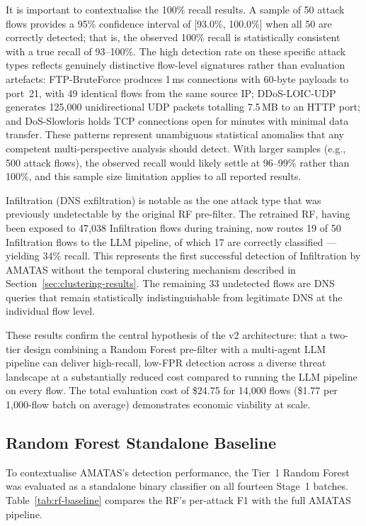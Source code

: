 \documentclass[../main.tex]{subfiles}
\begin{document}
It is important to contextualise the 100\% recall results. A sample of 50 attack flows provides a 95\% confidence interval of [93.0\%, 100.0\%] when all 50 are correctly detected; that is, the observed 100\% recall is statistically consistent with a true recall of 93--100\%. The high detection rate on these specific attack types reflects genuinely distinctive flow-level signatures rather than evaluation artefacts: FTP-BruteForce produces 1\,ms connections with 60-byte payloads to port~21, with 49 identical flows from the same source IP; DDoS-LOIC-UDP generates 125,000 unidirectional UDP packets totalling 7.5\,MB to an HTTP port; and DoS-Slowloris holds TCP connections open for minutes with minimal data transfer. These patterns represent unambiguous statistical anomalies that any competent multi-perspective analysis should detect. With larger samples (e.g., 500 attack flows), the observed recall would likely settle at 96--99\% rather than 100\%, and this sample size limitation applies to all reported results.

Infiltration (DNS exfiltration) is notable as the one attack type that was previously undetectable by the original RF pre-filter. The retrained RF, having been exposed to 47,038 Infiltration flows during training, now routes 19 of 50 Infiltration flows to the LLM pipeline, of which 17 are correctly classified --- yielding 34\% recall. This represents the first successful detection of Infiltration by AMATAS without the temporal clustering mechanism described in Section~\ref{sec:clustering-results}. The remaining 33 undetected flows are DNS queries that remain statistically indistinguishable from legitimate DNS at the individual flow level.

These results confirm the central hypothesis of the v2 architecture: that a two-tier design combining a Random Forest pre-filter with a multi-agent LLM pipeline can deliver high-recall, low-FPR detection across a diverse threat landscape at a substantially reduced cost compared to running the LLM pipeline on every flow. The total evaluation cost of \$24.75 for 14,000 flows (\$1.77 per 1,000-flow batch on average) demonstrates economic viability at scale.

\subsection{Random Forest Standalone Baseline}
\label{sec:rf-baseline}

To contextualise AMATAS's detection performance, the Tier~1 Random Forest was evaluated as a standalone binary classifier on all fourteen Stage~1 batches. Table~\ref{tab:rf-baseline} compares the RF's per-attack F1 with the full AMATAS pipeline.
\end{document}
